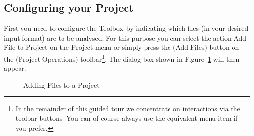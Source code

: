 \documentclass[\pformat,12pt]{article}
\newcommand{\Toolbox}{Toolbox}
\newcommand{\guicmd}[1]{{\sf #1}}
\begin{document}
\subsection{Configuring your Project}

First you need to configure the \Toolbox\ by indicating which 
files (in your desired input format) are to be analysed. For this
purpose you can select the action \guicmd{Add File to Project} on the
\guicmd{Project} menu or simply press the 
(\guicmd{Add Files}) button on the (\guicmd{Project Operations})
toolbar\footnote{In the remainder of this guided tour we concentrate
  on interactions via the toolbar buttons. You can of course always
  use the equivalent menu item if you prefer.}. The dialog box shown
in Figure~\ref{fig:addFiles} will then appear.

\begin{figure}[tbh]
\begin{center}
\caption{Adding Files to a Project}
\label{fig:addFiles}
\end{center}
\end{figure}
\end{document}
